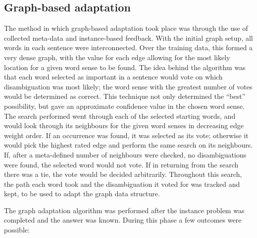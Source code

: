 \subsection{Graph-based adaptation}

The method in which graph-based adaptation took place was through the use of
collected meta-data and instance-based feedback.  With the initial graph
setup, all words in each sentence were interconnected. Over the training data,
this formed a very dense graph, with the value for each edge allowing for the
most likely location for a given word sense to be found.  The idea behind the
algorithm was that each word selected as important in a sentence would vote on which
disambiguation was most likely; the word sense with the greatest number of votes
would be determined as correct.  This technique not only determined the ``best''
possibility, but gave an approximate confidence value in the chosen word sense. The
search performed went through each of the selected starting words, and would
look through its neighbours for the given word senses in decreasing edge weight
order. If an occurrence was found, it was selected as its vote; otherwise it
would pick the highest rated edge and perform the same search on its neighbours.
If, after a meta-defined number of neighbours were checked, no
disambiguations were found, the selected word would not vote.  If in returning
from the search there was a tie, the vote would be decided arbitrarily.
Throughout this search, the path each word took and the disambiguation it voted
for was tracked and kept, to be used to adapt the graph data structure.

The graph adaptation algorithm was performed after the instance problem was
completed and the answer was known.  During this phase a few outcomes were
possible: 

